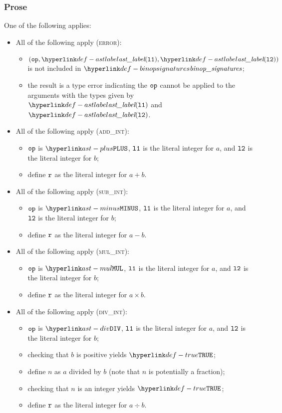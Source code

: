 \subsubsection{Prose}
One of the following applies:
\begin{itemize}
  \item All of the following apply (\textsc{error}):
  \begin{itemize}
    \item $(\op, \astlabel(\vlone), \astlabel(\vltwo))$ is not included in $\binopsignatures$;
    \item the result is a type error indicating the $\texttt{op}$ cannot be applied to the arguments
          with the types given by $\astlabel(\vlone)$ and $\astlabel(\vltwo)$.
  \end{itemize}

  \item All of the following apply (\textsc{add\_int}):
  \begin{itemize}
    \item $\texttt{op}$ is $\PLUS$, $\texttt{l1}$ is the literal integer for $a$, and $\texttt{l2}$ is the literal integer for $b$;
    \item define $\texttt{r}$ as the literal integer for $a+b$.
  \end{itemize}

  \item All of the following apply (\textsc{sub\_int}):
  \begin{itemize}
    \item $\texttt{op}$ is $\MINUS$, $\texttt{l1}$ is the literal integer for $a$, and $\texttt{l2}$ is the literal integer for $b$;
    \item define $\texttt{r}$ as the literal integer for $a-b$.
  \end{itemize}

  \item All of the following apply (\textsc{mul\_int}):
  \begin{itemize}
    \item $\texttt{op}$ is $\MUL$, $\texttt{l1}$ is the literal integer for $a$, and $\texttt{l2}$ is the literal integer for $b$;
    \item define $\texttt{r}$ as the literal integer for $a\times b$.
  \end{itemize}

  \item All of the following apply (\textsc{div\_int}):
  \begin{itemize}
    \item $\texttt{op}$ is $\DIV$, $\texttt{l1}$ is the literal integer for $a$, and $\texttt{l2}$ is the literal integer for $b$;
    \item checking that $b$ is positive yields $\True$\ProseOrTypeError;
    \item define $n$ as $a$ divided by $b$ (note that $n$ is potentially a fraction);
    \item checking that $n$ is an integer yields $\True$\ProseOrTypeError;
    \item define $\texttt{r}$ as the literal integer for $a\div b$.
  \end{itemize}


\end{itemize}
